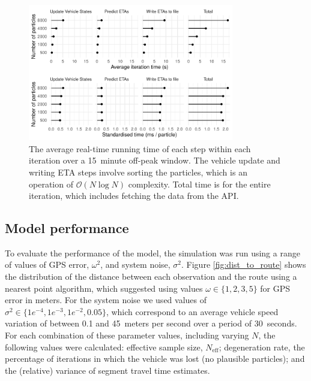 \begin{figure}[tb]
    \centering
    \includegraphics[width=0.8\textwidth]{figures/04_model_results_timing.pdf}
    \caption{
        The average real-time running time of each step within each iteration
        over a 15~minute off-peak window.
        The vehicle update and writing ETA steps involve sorting the particles,
        which is an operation of $\mathcal{O}(N\log N)$ complexity.
        Total time is for the entire iteration, which includes fetching the data from the API.
    }
    \label{fig:timings}
\end{figure}




\subsection{Model performance}
\label{sec:model_perf}


To evaluate the performance of the model,
the simulation was run using a range of values of GPS error, $\omega^2$,
and system noise, $\sigma^2$.
Figure \ref{fig:dist_to_route} shows the distribution of the distance
between each observation and the route using a nearest point algorithm,
which suggested using values $\omega \in \{1,2,3,5\}$ for GPS error in meters.
For the system noise we used values of $\sigma^2\in \{1e^{-4},1e^{-3},1e^{-2},0.05\}$,
which correspond to an average vehicle speed variation of between 0.1 and 45~meters per second
over a period of 30~seconds.
For each combination of these parameter values, including varying $N$,
the following values were calculated:
effective sample size, $N_\text{eff}$;
degeneration rate, the percentage of iterations in which the vehicle was lost
(no plausible particles);
and the (relative) variance of segment travel time estimates.


